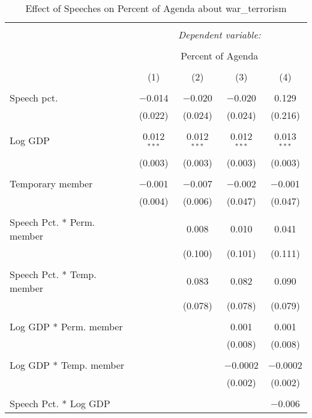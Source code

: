 
\begin{table}[!htbp] \centering 
  \caption{Effect of Speeches on Percent of Agenda about  war_terrorism} 
  \label{} 
\begin{tabular}{@{\extracolsep{5pt}}lcccc} 
\\[-1.8ex]\hline 
\hline \\[-1.8ex] 
 & \multicolumn{4}{c}{\textit{Dependent variable:}} \\ 
\cline{2-5} 
\\[-1.8ex] & \multicolumn{4}{c}{Percent of Agenda} \\ 
\\[-1.8ex] & (1) & (2) & (3) & (4)\\ 
\hline \\[-1.8ex] 
 Speech pct. & $-$0.014 & $-$0.020 & $-$0.020 & 0.129 \\ 
  & (0.022) & (0.024) & (0.024) & (0.216) \\ 
  & & & & \\ 
 Log GDP & 0.012$^{***}$ & 0.012$^{***}$ & 0.012$^{***}$ & 0.013$^{***}$ \\ 
  & (0.003) & (0.003) & (0.003) & (0.003) \\ 
  & & & & \\ 
 Temporary member & $-$0.001 & $-$0.007 & $-$0.002 & $-$0.001 \\ 
  & (0.004) & (0.006) & (0.047) & (0.047) \\ 
  & & & & \\ 
 Speech Pct. * Perm. member &  & 0.008 & 0.010 & 0.041 \\ 
  &  & (0.100) & (0.101) & (0.111) \\ 
  & & & & \\ 
 Speech Pct. * Temp. member &  & 0.083 & 0.082 & 0.090 \\ 
  &  & (0.078) & (0.078) & (0.079) \\ 
  & & & & \\ 
 Log GDP * Perm. member &  &  & 0.001 & 0.001 \\ 
  &  &  & (0.008) & (0.008) \\ 
  & & & & \\ 
 Log GDP * Temp. member &  &  & $-$0.0002 & $-$0.0002 \\ 
  &  &  & (0.002) & (0.002) \\ 
  & & & & \\ 
 Speech Pct. * Log GDP &  &  &  & $-$0.006 \\ 

\end{tabular}
\end{table}
